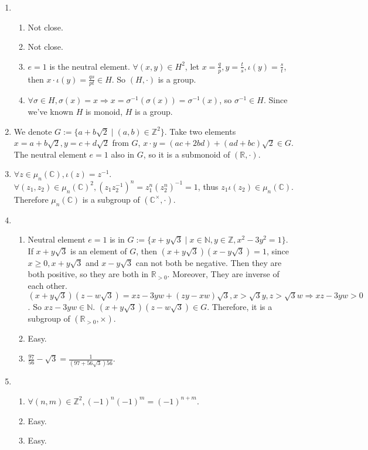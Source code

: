 \documentclass[12pt]{article}
\newcommand{\NN}{\mathbb{N}}
\newcommand{\ZZ}{\mathbb{Z}}
\newcommand{\RR}{\mathbb{R}}
\newcommand{\CC}{\mathbb{C}}
\begin{document}
\begin{enumerate}
    \item 
        \begin{enumerate}
            \item Not close.
            \item Not close.
            \item $e=1$ is the neutral element. $\forall (x,y)\in H^2$, let $x=\frac{q}{p},y=\frac{t}{s},\iota(y)=\frac{s}{t}$, then $x\cdot\iota(y)=\frac{qs}{pt}\in H$. So $(H,\cdot)$ is a group.
            \item $\forall \sigma\in H,\sigma(x)=x\Rightarrow x=\sigma^{-1}(\sigma(x))=\sigma^{-1}(x)$, so $\sigma^{-1}\in H$. Since we've known $H$ is monoid, $H$ is a group.
        \end{enumerate}
    \item We denote $G:=\{a+b\sqrt{2}\mid(a,b)\in \ZZ^2\}$. Take two elements $x=a+b\sqrt{2},y=c+d\sqrt{2}$ from $G$, $x\cdot y=(ac+2bd)+(ad+bc)\sqrt{2}\in G$. The neutral element $e=1$ also in $G$, so it is a submonoid of $(\RR,\cdot)$.
    \item $\forall z\in \mu_n(\CC),\iota(z)=z^{-1}$. $\forall (z_1,z_2)\in \mu_n(\CC)^2,(z_1 z_2^{-1})^n=z_{1}^{n}(z_{2}^{n})^{-1}=1$, thus $z_1\iota(z_2)\in \mu_{n}(\CC)$. Therefore $\mu_{n}(\CC)$ is a subgroup of $(\CC^\times,\cdot)$.
    \item 
        \begin{enumerate}
            \item Neutral element $e=1$ is in $G:=\{x+y\sqrt{3}\mid x\in \NN,y\in \ZZ,x^2-3y^2=1\}$. If $x+y\sqrt{3}$ is an element of $G$, then $(x+y\sqrt{3})(x-y\sqrt{3})=1$, since $x\ge 0,x+y\sqrt{3}$ and $x-y\sqrt{3}$ can not both be negative. Then they are both positive, so they are both in $\RR_{>0}$. Moreover, They are inverse of each other. $(x+y\sqrt{3})(z-w\sqrt{3})=xz-3yw+(zy-xw)\sqrt{3},x>\sqrt{3}y,z>\sqrt{3}w\Rightarrow xz-3yw>0$. So $xz-3yw\in \NN$. $(x+y\sqrt{3})(z-w\sqrt{3})\in G$. Therefore, it is a subgroup of $(\RR_{>0},\times)$.
            \item Easy.
            \item $\frac{97}{56}-\sqrt{3}=\frac{1}{(97+56\sqrt{3})56}$.
        \end{enumerate}
    \item 
        \begin{enumerate}
            \item $\forall (n,m)\in \ZZ^2,(-1)^n(-1)^m=(-1)^{n+m}$.
            \item Easy.
            \item Easy.

\end{enumerate}
\end{enumerate}
\end{document}
